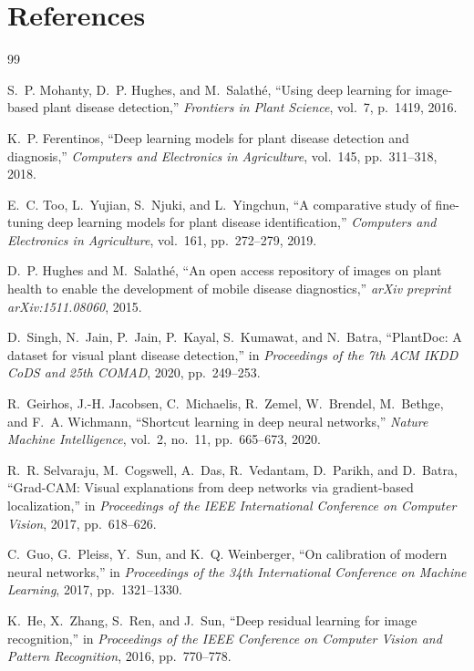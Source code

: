 
\chapter*{References}
\thispagestyle{plain}

\begin{thebibliography}{99}
\setlength{\itemsep}{2pt}

S.~P. Mohanty, D.~P. Hughes, and M.~Salath\'e,
``Using deep learning for image-based plant disease detection,''
\emph{Frontiers in Plant Science}, vol.~7, p.~1419, 2016.

K.~P. Ferentinos,
``Deep learning models for plant disease detection and diagnosis,''
\emph{Computers and Electronics in Agriculture}, vol.~145, pp.~311--318, 2018.

E.~C. Too, L.~Yujian, S.~Njuki, and L.~Yingchun,
``A comparative study of fine-tuning deep learning models for plant disease identification,''
\emph{Computers and Electronics in Agriculture}, vol.~161, pp.~272--279, 2019.

D.~P. Hughes and M.~Salath\'e,
``An open access repository of images on plant health to enable the development of mobile disease diagnostics,''
\emph{arXiv preprint arXiv:1511.08060}, 2015.

D.~Singh, N.~Jain, P.~Jain, P.~Kayal, S.~Kumawat, and N.~Batra,
``PlantDoc: A dataset for visual plant disease detection,''
in \emph{Proceedings of the 7th ACM IKDD CoDS and 25th COMAD}, 2020, pp.~249--253.

R.~Geirhos, J.-H. Jacobsen, C.~Michaelis, R.~Zemel, W.~Brendel, M.~Bethge, and F.~A. Wichmann,
``Shortcut learning in deep neural networks,''
\emph{Nature Machine Intelligence}, vol.~2, no.~11, pp.~665--673, 2020.

R.~R. Selvaraju, M.~Cogswell, A.~Das, R.~Vedantam, D.~Parikh, and D.~Batra,
``Grad-CAM: Visual explanations from deep networks via gradient-based localization,''
in \emph{Proceedings of the IEEE International Conference on Computer Vision}, 2017, pp.~618--626.

C.~Guo, G.~Pleiss, Y.~Sun, and K.~Q. Weinberger,
``On calibration of modern neural networks,''
in \emph{Proceedings of the 34th International Conference on Machine Learning}, 2017, pp.~1321--1330.

K.~He, X.~Zhang, S.~Ren, and J.~Sun,
``Deep residual learning for image recognition,''
in \emph{Proceedings of the IEEE Conference on Computer Vision and Pattern Recognition}, 2016, pp.~770--778.


\end{thebibliography}
